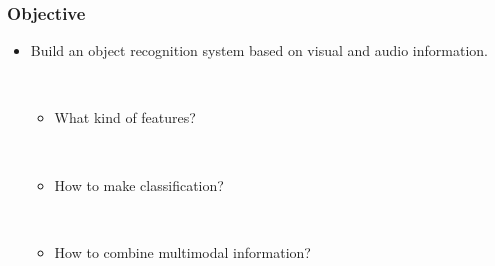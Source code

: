 \documentclass[t]{beamer}
\begin{document}
\begin{frame}
  \frametitle{Objective}

  \begin{itemize}
    \item Build an object recognition system based on visual and audio information.

      ~
      \begin{itemize}
        \item What kind of features?

          ~
        \item How to make classification?

          ~
        \item How to combine multimodal information?
      \end{itemize}
  \end{itemize}
\end{frame}

\end{document}
